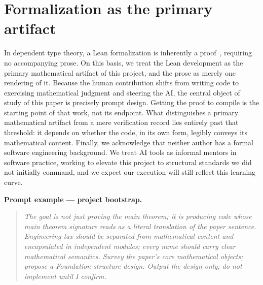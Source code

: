 \section{Formalization as the primary artifact}\label{sec:methodology}

\sloppy

In dependent type theory, a Lean formalization is inherently a proof~\cite{deMoura2021Lean4}, requiring no accompanying prose. On this basis, we treat the Lean development as the primary mathematical artifact of this project, and the prose as merely one rendering of it. Because the human contribution shifts from writing code to exercising mathematical judgment and steering the AI, the central object of study of this paper is precisely prompt design. Getting the proof to compile is the starting point of that work, not its endpoint. What distinguishes a primary mathematical artifact from a mere verification record lies entirely past that threshold: it depends on whether the code, in its own form, legibly conveys its mathematical content. Finally, we acknowledge that neither author has a formal software engineering background. We treat AI tools as informal mentors in software practice, working to elevate this project to structural standards we did not initially command, and we expect our execution will still reflect this learning curve.

\medskip
\noindent\textbf{Prompt example --- project bootstrap.}
\begin{quote}\itshape\small
The goal is not just proving the main theorem; it is producing code
whose main theorem signature reads as a literal translation of the paper
sentence. Engineering tax should be separated from mathematical content
and encapsulated in independent modules; every name should carry clear
mathematical semantics. Survey the paper's core mathematical objects;
propose a Foundation-structure design. Output the design only; do
not implement until I confirm.
\end{quote}


